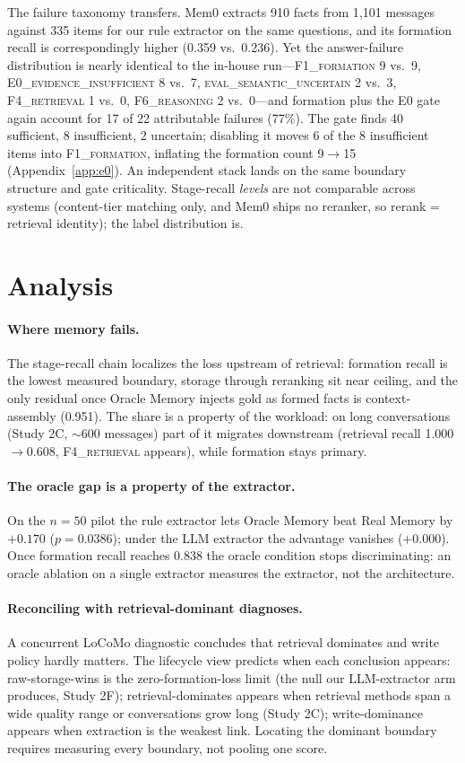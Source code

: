 \documentclass[11pt]{article}
\newcommand{\fone}{F1\textsc{\_formation}}
\newcommand{\ffour}{F4\textsc{\_retrieval}}
\newcommand{\fsix}{F6\textsc{\_reasoning}}
\newcommand{\ezero}{E0\textsc{\_evidence\_insufficient}}
\newcommand{\evaluncertain}{\textsc{eval\_semantic\_uncertain}}
\begin{document}
The failure taxonomy transfers. Mem0 extracts 910 facts from 1{,}101
messages against 335 items for our rule extractor on the same questions,
and its formation recall is correspondingly higher (0.359 vs.\ 0.236).
Yet the answer-failure distribution is nearly identical to the in-house
run---\fone{} 9 vs.\ 9, \ezero{} 8 vs.\ 7, \evaluncertain{} 2 vs.\ 3,
\ffour{} 1 vs.\ 0, \fsix{} 2 vs.\ 0---and formation plus the E0 gate
again account for 17 of 22 attributable failures (77\%). The gate finds
40 sufficient, 8 insufficient, 2 uncertain; disabling it moves 6 of the
8 insufficient items into \fone{}, inflating the formation count
9$\to$15 (Appendix~\ref{app:e0}). An independent stack lands on the
same boundary structure and gate criticality.
Stage-recall \emph{levels} are not comparable across systems (content-tier
matching only, and Mem0 ships no reranker, so rerank = retrieval
identity); the label distribution is.

\section{Analysis}
\label{sec:analysis}

\paragraph{Where memory fails.}
The stage-recall chain localizes the loss upstream of retrieval:
formation recall is the lowest measured boundary, storage through
reranking sit near ceiling, and the only residual once Oracle Memory
injects gold as formed facts is context-assembly (0.951). The share is a
property of the workload: on long conversations (Study 2C, $\sim$600
messages) part of it migrates downstream (retrieval recall
1.000$\to$0.608, \ffour{} appears), while formation stays primary.

\paragraph{The oracle gap is a property of the extractor.}
On the $n{=}50$ pilot the rule extractor lets Oracle Memory beat Real
Memory by $+0.170$ ($p{=}0.0386$); under the LLM extractor the advantage
vanishes ($+0.000$). Once formation recall reaches 0.838 the oracle
condition stops discriminating: an oracle ablation on a single extractor
measures the extractor, not the architecture.

\paragraph{Reconciling with retrieval-dominant diagnoses.} A concurrent
LoCoMo diagnostic \cite{memory-probe} concludes that retrieval dominates
and write policy hardly matters. The lifecycle view predicts when each
conclusion appears: raw-storage-wins is the zero-formation-loss limit
(the null our LLM-extractor arm produces, Study 2F); retrieval-dominates
appears when retrieval methods span a wide quality range or conversations
grow long (Study 2C); write-dominance appears when extraction is the
weakest link. Locating the dominant boundary requires measuring every
boundary, not pooling one score.
\end{document}
